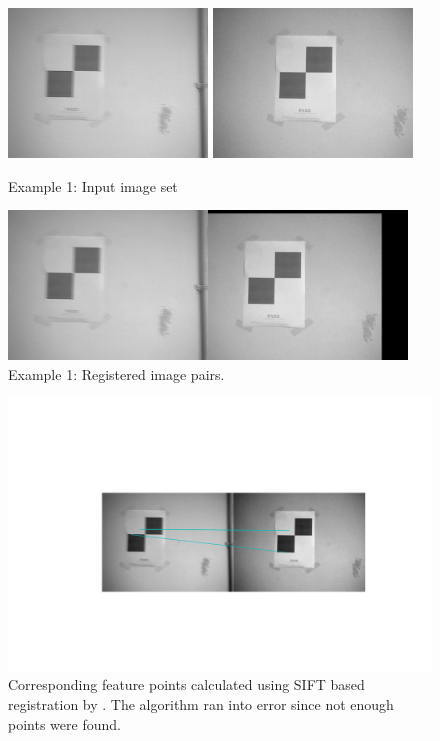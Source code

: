 \documentclass[BTech]{iitmdiss}
\begin{document}
\begin{figure}[H]
\begin{center}
\includegraphics[width=150pt]{images/imreg/shift/eg1/saved_im.png}
\includegraphics[width=150pt]{images/imreg/shift/eg1/preview_im.png}
\caption{Example 1: Input image set}
\includegraphics[width=300pt]{images/imreg/shift/eg1/imreg.png}
\caption{Example 1: Registered image pairs.}
\end{center}
\end{figure}

\begin{figure}[H]
\begin{center}
\includegraphics[width=400pt]{images/imreg/shift/eg1/sift_based.png}
\caption{Corresponding feature points calculated using SIFT based registration
by \citet{pyimreg}. The algorithm ran into error since not enough points were found.}
\end{center}
\end{figure}
\end{document}
